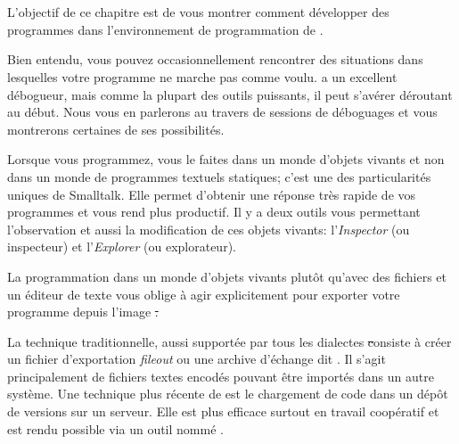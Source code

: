 \documentclass[a4paper,10pt,twoside]{book}
\begin{document}
	\sloppy
\fi

\chapter{\titreEnvironment}


L'objectif de ce chapitre est de vous montrer comment d\'evelopper des programmes dans l'environnement de programmation de \pharo.

Bien entendu, vous pouvez occasionnellement rencontrer
des situations dans lesquelles votre programme ne marche pas comme voulu.
\pharo a un excellent d\'ebogueur, mais comme la plupart des outils puissants, il peut s'av\'erer d\'eroutant au d\'ebut.
Nous vous en parlerons au travers de sessions de d\'eboguages et vous
montrerons certaines de ses possibilit\'es.

Lorsque vous programmez, vous le faites dans un monde d'objets vivants et
non dans un monde de programmes textuels statiques; c'est 
une des particularit\'es uniques de Smalltalk.
Elle permet d'obtenir une r\'eponse tr\`es rapide de vos programmes et vous rend plus productif. Il y a deux outils vous permettant l'observation et aussi la modification de ces objets vivants: l'\emph{Inspector} (ou inspecteur) et l'\emph{Explorer} (ou explorateur).

La programmation dans un monde d'objets vivants plut\^ot qu'avec des fichiers et un \'editeur de texte vous oblige \`a agir explicitement pour exporter votre programme depuis l'image \st.

La technique traditionnelle, aussi support\'ee par tous les dialectes \st consiste \`a cr\'eer un fichier d'exportation \emph{fileout} ou une archive d'\'echange dit \changeset. Il s'agit principalement de fichiers textes encod\'es pouvant \^etre import\'es dans un autre syst\`eme.
Une technique plus r\'ecente de \pharo est le chargement de code dans un d\'ep\^ot de versions sur un serveur.
Elle est plus efficace surtout en travail coop\'eratif et est rendu possible via un outil nomm\'e .
\end{document}
